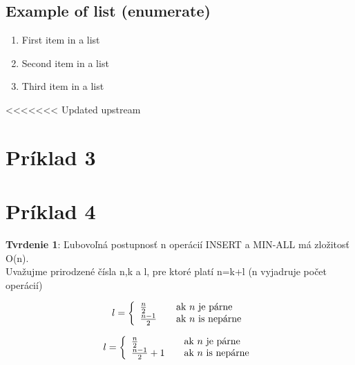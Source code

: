 \documentclass[paper=a4, fontsize=11pt]{scrartcl} %
\numberwithin{equation}{section} %
\numberwithin{figure}{section} %
\numberwithin{table}{section} %
\begin{document}

\subsection{Example of list (enumerate)}
\begin{enumerate}
\item First item in a list 
\item Second item in a list 
\item Third item in a list
\end{enumerate}


<<<<<<< Updated upstream
\pagebreak

\section*{Príklad 3}

\pagebreak

\section*{Príklad 4}

\textbf{Tvrdenie 1}: Ľubovoľná postupnosť n operácií INSERT  a MIN-ALL má zložitosť O(n). \\

Uvažujme prirodzené čísla n,k a l, pre ktoré platí n=k+l (n vyjadruje počet operácií)

\[ l = \left\{ 
  \begin{array}{l l}
    \frac{n}{2} & \quad \text{ak $n$ je párne}\\
    \frac{n-1}{2} & \quad \text{ak $n$ is nepárne}
  \end{array} \right.\]

\[ l = \left\{ 
  \begin{array}{l l}
    \frac{n}{2} & \quad \text{ak $n$ je párne}\\
    \frac{n-1}{2} + 1 & \quad \text{ak $n$ is nepárne}
  \end{array} \right.\]
\end{document}
